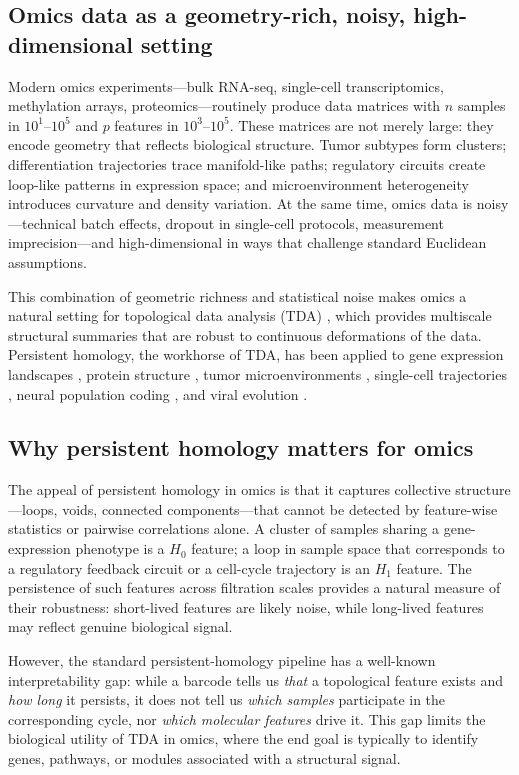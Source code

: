 \documentclass[11pt]{article}
\begin{document}
\subsection{Omics data as a geometry-rich, noisy, high-dimensional setting}

Modern omics experiments---bulk RNA-seq, single-cell transcriptomics, methylation arrays, proteomics---routinely produce data matrices with $n$ samples in $10^1$--$10^5$ and $p$ features in $10^3$--$10^5$.
These matrices are not merely large: they encode geometry that reflects biological structure.
Tumor subtypes form clusters; differentiation trajectories trace manifold-like paths; regulatory circuits create loop-like patterns in expression space; and microenvironment heterogeneity introduces curvature and density variation.
At the same time, omics data is noisy---technical batch effects, dropout in single-cell protocols, measurement imprecision---and high-dimensional in ways that challenge standard Euclidean assumptions.

This combination of geometric richness and statistical noise makes omics a natural setting for topological data analysis (TDA) \cite{carlsson2009, edelsbrunner2010}, which provides multiscale structural summaries that are robust to continuous deformations of the data.
Persistent homology, the workhorse of TDA, has been applied to gene expression landscapes \cite{rizvi2017}, protein structure \cite{xia2014}, tumor microenvironments \cite{vipond2021}, single-cell trajectories \cite{moon2019phate}, neural population coding \cite{giusti2015}, and viral evolution \cite{chan2013topology}.

\subsection{Why persistent homology matters for omics}

The appeal of persistent homology in omics is that it captures collective structure---loops, voids, connected components---that cannot be detected by feature-wise statistics or pairwise correlations alone.
A cluster of samples sharing a gene-expression phenotype is a $H_0$ feature; a loop in sample space that corresponds to a regulatory feedback circuit or a cell-cycle trajectory is an $H_1$ feature.
The persistence of such features across filtration scales provides a natural measure of their robustness: short-lived features are likely noise, while long-lived features may reflect genuine biological signal.

However, the standard persistent-homology pipeline has a well-known interpretability gap: while a barcode tells us \emph{that} a topological feature exists and \emph{how long} it persists, it does not tell us \emph{which samples} participate in the corresponding cycle, nor \emph{which molecular features} drive it.
This gap limits the biological utility of TDA in omics, where the end goal is typically to identify genes, pathways, or modules associated with a structural signal.
\end{document}
